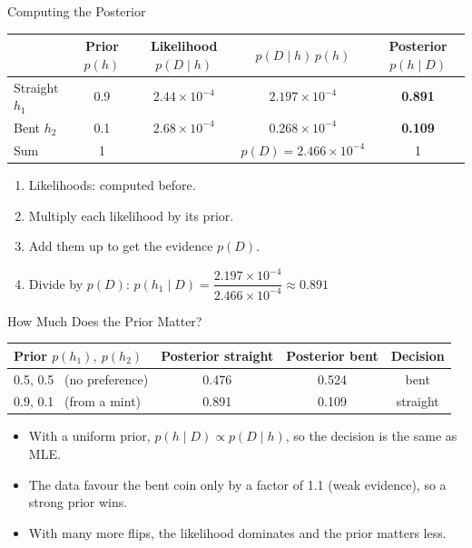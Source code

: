 \documentclass[aspectratio=169]{beamer}
\begin{document}
\begin{frame}{Computing the Posterior}
\centering
\small
\begin{tabular}{lcccc}
\toprule
 & Prior $p(h)$ & Likelihood $p(D\mid h)$ & $p(D\mid h)\,p(h)$ & Posterior $p(h\mid D)$ \\
\midrule
Straight $h_1$ & 0.9 & $2.44\times10^{-4}$ & $2.197\times10^{-4}$ & \textbf{0.891} \\
Bent $h_2$     & 0.1 & $2.68\times10^{-4}$ & $0.268\times10^{-4}$ & \textbf{0.109} \\
\midrule
Sum            & 1   &                     & $p(D) = 2.466\times10^{-4}$ & 1 \\
\bottomrule
\end{tabular}

\vspace{0.4cm}
\normalsize
\raggedright
\begin{enumerate}
  \item Likelihoods: computed before.
  \item Multiply each likelihood by its prior.
  \item Add them up to get the evidence $p(D)$.
  \item Divide by $p(D)$: \quad
  $p(h_1\mid D) = \dfrac{2.197\times10^{-4}}{2.466\times10^{-4}} \approx 0.891$
\end{enumerate}
\end{frame}

\begin{frame}{How Much Does the Prior Matter?}
\centering
\begin{tabular}{lccc}
\toprule
Prior $p(h_1),\ p(h_2)$ & Posterior straight & Posterior bent & Decision \\
\midrule
0.5, 0.5 \ (no preference) & 0.476 & 0.524 & bent \\
0.9, 0.1 \ (from a mint)   & 0.891 & 0.109 & straight \\
\bottomrule
\end{tabular}

\vspace{0.4cm}
\raggedright
\begin{itemize}
  \item With a uniform prior, $p(h\mid D) \propto p(D\mid h)$, so the decision is the same as MLE.
  \item The data favour the bent coin only by a factor of 1.1 (weak evidence), so a strong prior wins.
  \item With many more flips, the likelihood dominates and the prior matters less.
\end{itemize}
\end{frame}
\end{document}

